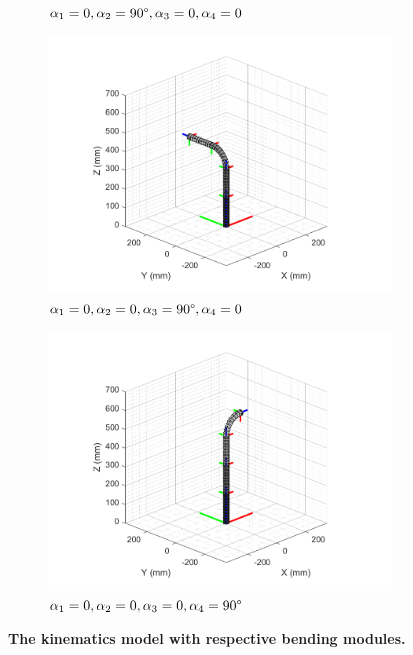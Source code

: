 \begin{figure}[H]
\begin{subfigure}{0.48\textwidth}
        \caption{$\alpha_1=0,\alpha_2=90 \degree,\alpha_3=0,\alpha_4=0$}
    \end{subfigure}
    \begin{subfigure}{0.48\textwidth} %
        \centering
        \includegraphics[width=\linewidth]{Image/MATLAB/manipulator_0_0_90_0.png}
        \caption{$\alpha_1=0,\alpha_2=0,\alpha_3=90 \degree,\alpha_4=0$}
    \end{subfigure}
    \hfill
    \begin{subfigure}{0.48\textwidth}
        \centering
        \includegraphics[width=\linewidth]{Image/MATLAB/manipulator_0_0_0_90.png}
        \caption{$\alpha_1=0,\alpha_2=0,\alpha_3=0,\alpha_4=90 \degree$}
    \end{subfigure}
    \caption[The kinematics model of manipulator with respective bending modules]
    {\centering \textbf{The kinematics model with respective bending modules.}}
    \label{fig:kinematics_model_resp}
\end{figure}
